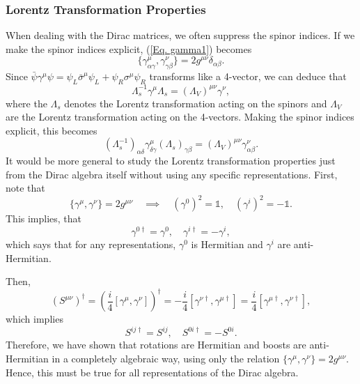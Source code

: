 \documentclass[11pt]{article}
\theoremstyle{definition}
\begin{document}
\subsubsection{Lorentz Transformation Properties}
When dealing with the Dirac matrices, we often suppress the spinor indices. If we make the spinor indices explicit, (\ref{Eq. gamma1}) becomes
\begin{equation}
    \{\gamma^\mu_{\alpha\gamma}, \gamma^\nu_{\gamma\beta}\} = 2g^{\mu\nu}\delta_{\alpha\beta}.
\end{equation}
Since $\bar{\psi}\gamma^\mu\psi = \psi_L\bar{\sigma}^\mu\psi_L + \psi_R\sigma^\mu\psi_R$ transforms like a 4-vector, we can deduce that
\begin{equation}
    \Lambda_s^{-1}\gamma^\mu\Lambda_s = (\Lambda_V)^{\mu\nu}\gamma^\nu,
\end{equation}
where the $\Lambda_s$ denotes the Lorentz transformation acting on the spinors and $\Lambda_V$ are the Lorentz transformation acting on the 4-vectors. Making the spinor indices explicit, this becomes
\begin{equation}
    (\Lambda_s^{-1})_{\alpha\delta}\gamma^\mu_{\delta\gamma}(\Lambda_s)_{\gamma\beta} = (\Lambda_V)^{\mu\nu}\gamma^\nu_{\alpha\beta}.
\end{equation}
It would be more general to study the Lorentz transformation properties just from the Dirac algebra itself without using any specific representations. First, note that
\begin{equation}
    \{\gamma^\mu, \gamma^\nu\} = 2g^{\mu\nu} \quad \implies \quad (\gamma^0)^2 = \mathds{1}, \quad (\gamma^i)^2 = -\mathds{1}.
\end{equation}
This implies, that
\begin{equation}
    \gamma^{0\dagger} = \gamma^0, \quad \gamma^{i\dagger} = -\gamma^i,
\end{equation}
which says that for any representations, $\gamma^0$ is Hermitian and $\gamma^i$ are anti-Hermitian.

Then,
\begin{equation}
    (S^{\mu\nu})^\dagger = \left(\frac{i}{4}[\gamma^\mu, \gamma^\nu]\right)^\dagger = -\frac{i}{4}[\gamma^{\nu\dagger}, \gamma^{\mu\dagger}] = \frac{i}{4}[\gamma^{\mu\dagger}, \gamma^{\nu\dagger}],
\end{equation}
which implies
\begin{equation}
    S^{ij\dagger} = S^{ij}, \quad S^{0i\dagger} = -S^{0i}.
\end{equation}
Therefore, we have shown that rotations are Hermitian and boosts are anti-Hermitian in a completely algebraic way, using only the relation $\{\gamma^\mu, \gamma^\nu\} = 2g^{\mu\nu}$. Hence, this must be true for all representations of the Dirac algebra.
\end{document}
